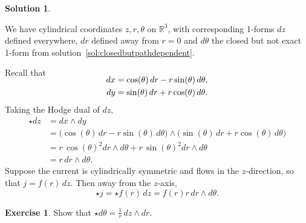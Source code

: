 \documentclass[11pt, a4paper]{report}
\theoremstyle{definition}
\newtheorem{ex}{Exercise}[part]
\newtheorem{sol}{Solution}[part]
\begin{document}
\begin{sol}\label{sol:cylindricaldualcurrent}

We have cylindrical coordinates $z, r, \theta$ on $\mathbb{R}^3$, with corresponding 1-forms $dz$ defined everywhere, $dr$ defined away from $r = 0$ and $d\theta$ the closed but not exact 1-form from solution~\ref{sol:closedbutpathdependent}.

Recall that
\begin{align*}
    \SwapAboveDisplaySkip
    dx &= \cos(\theta) \, dr - r \sin(\theta) \, d\theta, \\
    dy &= \sin(\theta) \, dr + r \cos(\theta) \, d\theta.
\end{align*}
Taking the Hodge dual of $dz$,
\begin{align*}
    \star dz &= dx \wedge dy \\
             &= \bigl( \cos(\theta) \, dr -r \sin(\theta) \, d\theta \bigr)
                       \wedge (\sin(\theta) \, dr + r \cos(\theta) \, d\theta \bigr) \\
             &= r \, {\cos(\theta)}^2 dr \wedge d\theta + r \, {\sin(\theta)}^2 dr \wedge d\theta \\
             &= r \, dr \wedge d\theta.
\end{align*}
Suppose the current is cylindrically symmetric and flows in the $z$-direction, so that $j = f(r) \, dz$. Then away from the $z$-axis,
\[
    \star j = \star f(r) \, dz = f(r) r \, dr \wedge d\theta.
\]

\end{sol}

\begin{ex}

Show that $\star d\theta = \frac{1}{r} \, dz \wedge dr$.

\end{ex}
\end{document}

